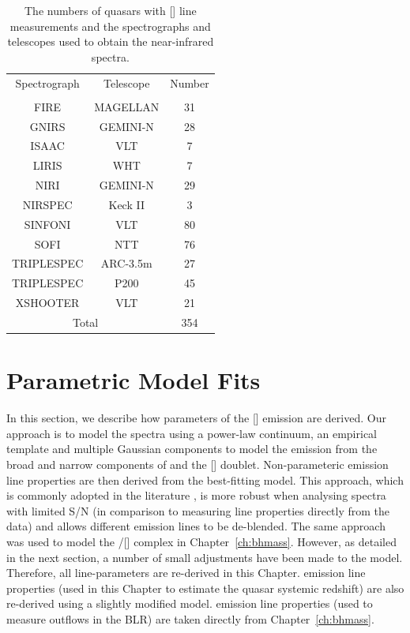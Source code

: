 \begin{table}
  \centering
  \small 
  \caption{The numbers of quasars with [] line measurements and the spectrographs and telescopes used to obtain the near-infrared spectra.}
  \label{tab:specnums_ch4}
    \begin{tabular}{ccc} 
    \hline
    Spectrograph & Telescope & Number \\
                 &           & \\
    \hline
    FIRE         & MAGELLAN  & 31 \\
    GNIRS        & GEMINI-N  & 28 \\
    ISAAC        & VLT       & 7 \\
    LIRIS        & WHT       & 7 \\
    NIRI         & GEMINI-N  & 29 \\
    NIRSPEC      & Keck II   & 3 \\
    SINFONI      & VLT       & 80 \\
    SOFI         & NTT       & 76 \\
    TRIPLESPEC   & ARC-3.5m  & 27 \\
    TRIPLESPEC   & P200      & 45 \\
    XSHOOTER     & VLT       & 21 \\
    \hline
    \multicolumn{2}{c}{Total} & 354 \\
    \hline
    \end{tabular}
\end{table} 

\section{Parametric Model Fits}

In this section, we describe how parameters of the [] emission are derived. 
Our approach is to model the spectra using a power-law continuum, an empirical  template and multiple Gaussian components to model the emission from the broad and narrow components of \hb and the [] doublet.
Non-parameteric emission line properties are then derived from the best-fitting model. 
This approach, which is commonly adopted in the literature \citep[e.g.][]{shen11,shen12,shen16a}, is more robust when analysing spectra with limited S/N (in comparison to measuring line properties directly from the data) and allows different emission lines to be de-blended.
The same approach was used to model the \hbns/[] complex in Chapter~\ref{ch:bhmass}. 
However, as detailed in the next section, a number of small adjustments have been made to the model. 
Therefore, all line-parameters are re-derived in this Chapter. 
\ha emission line properties (used in this Chapter to estimate the quasar systemic redshift) are also re-derived using a slightly modified model. 
 emission line properties (used to measure outflows in the BLR) are taken directly from Chapter~\ref{ch:bhmass}. 

